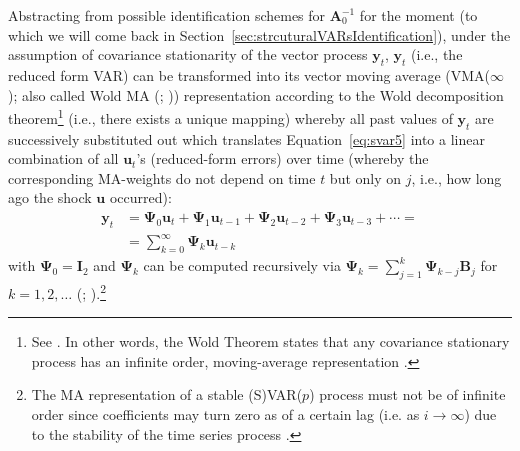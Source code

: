 \documentclass[a4paper,11pt,listof=nochaptergap,oneside,pointednumbers,bibtotoc,bigheadings,liststotoc,hidelinks]{scrbook}
\theoremstyle{mysatz}
\theoremstyle{mydefinition}
\theoremstyle{mytheorem}
\theoremstyle{mybemerkung}
\newcommand{\vect}[1]{\boldsymbol{\mathbf{#1}}}
\begin{document}
Abstracting from possible identification schemes for $\vect{A}_0^{-1}$ for the moment (to which we will come back in Section~\ref{sec:strcuturalVARsIdentification}), under the assumption of covariance stationarity \citep{lutkepohlkilian:17} of the vector process $\vect{y}_t$, $\vect{y}_t$ (i.e., the reduced form VAR) can be transformed into its vector moving average (VMA($\infty$); also called Wold MA (\citealp{lutkepohl:05}; \citealp{lutkepohlkilian:17})) representation according to the Wold decomposition theorem\footnote{See \citet{wold:38}. In other words, the Wold Theorem states that any covariance stationary process has an infinite order, moving-average representation \citep{lutkepohl:05}.} (i.e., there exists a unique mapping) whereby all past values of $\vect{y}_t$ are successively substituted out which translates Equation~\ref{eq:svar5} into a linear combination of all $\vect{u}_t$'s (reduced-form errors) over time (whereby the corresponding MA-weights do not depend on time $t$ but only on $j$, i.e., how long ago the shock $\vect{u}$ occurred):
\begin{equation} \label{eq:svar7}
\begin{split}
 			\vect{y}_t & = \vect{\Psi}_0\vect{u}_t + \vect{\Psi}_1\vect{u}_{t-1} + \vect{\Psi}_{2}\vect{u}_{t-2} + \vect{\Psi}_{3}\vect{u}_{t-3} + \cdots = \\
			& = \sum\limits_{k=0}^\infty \vect{\Psi}_k\vect{u}_{t-k}
\end{split}								
\end{equation}
with $\vect{\Psi}_0 =\vect{\mathbf{I}}_2$ and $\vect{\Psi}_k$ can be computed recursively via $\vect{\Psi}_k = \sum\limits_{j=1}^k \vect{\Psi}_{k-j}\vect{B}_j$ for $k=1, 2, \dots$ (\citealp{lutkepohlkilian:17}; \citealp{lutkepohl:05}).\footnote{The MA representation of a stable (S)VAR($p$) process must not be of infinite order since coefficients may turn zero as of a certain lag (i.e. as $i \rightarrow \infty$) due to the stability of the time series process \citep{lutkepohl:05}.}
\end{document}
